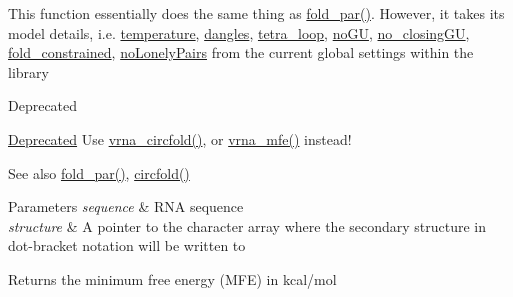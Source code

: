 This function essentially does the same thing as \hyperlink{group__mfe__fold__single_ga2bc41df5d71fee6fd8da9904ee65d8fb}{fold\+\_\+par()}. However, it takes its model details, i.\+e. \hyperlink{group__model__details_gab4b11c8d9c758430960896bc3fe82ead}{temperature}, \hyperlink{group__model__details_ga72b511ed1201f7e23ec437e468790d74}{dangles}, \hyperlink{group__model__details_ga4f6265bdf0ead7ff4628a360adbfd77e}{tetra\+\_\+loop}, \hyperlink{group__model__details_gabf380d09e4f1ab94fc6af57cf0ad5d32}{no\+G\+U}, \hyperlink{group__model__details_gaa8d1c7b92489179e1eafa562b7bdd259}{no\+\_\+closing\+G\+U}, \hyperlink{fold__vars_8h_a0afc287c2464866d94858c39175154af}{fold\+\_\+constrained}, \hyperlink{group__model__details_ga097eccaabd6ae8b4fef83cccff85bb5d}{no\+Lonely\+Pairs} from the current global settings within the library

\begin{DoxyRefDesc}{Deprecated}
\item[\hyperlink{deprecated__deprecated000072}{Deprecated}]Use \hyperlink{group__mfe__fold__single_gaa0f5bf321038f404b36a6147bdae4154}{vrna\+\_\+circfold()}, or \hyperlink{group__mfe__fold_gabd3b147371ccf25c577f88bbbaf159fd}{vrna\+\_\+mfe()} instead!\end{DoxyRefDesc}


\begin{DoxySeeAlso}{See also}
\hyperlink{group__mfe__fold__single_ga2bc41df5d71fee6fd8da9904ee65d8fb}{fold\+\_\+par()}, \hyperlink{group__mfe__fold__single_ga4ac63ab3e8d9a80ced28b8052d94e423}{circfold()}
\end{DoxySeeAlso}

\begin{DoxyParams}{Parameters}
{\em sequence} & R\+N\+A sequence \\
\hline
{\em structure} & A pointer to the character array where the secondary structure in dot-\/bracket notation will be written to \\
\hline
\end{DoxyParams}
\begin{DoxyReturn}{Returns}
the minimum free energy (M\+F\+E) in kcal/mol 
\end{DoxyReturn}
\hypertarget{group__mfe__fold__single_ga107fdfe5fd641868156bfd849f6866c7}{}
